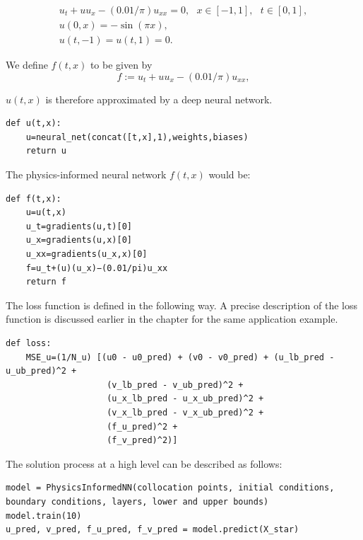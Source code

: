 \documentclass[book.tex]{subfiles}
\begin{document}
\[
\begin{array}{l}
u_t + u u_x - (0.01/\pi) u_{xx} = 0,\ \ \ x \in [-1,1],\ \ \ t \in [0,1],\\
u(0,x) = -\sin(\pi x),\\
u(t,-1) = u(t,1) = 0.
\end{array}
\]

We define $f(t,x)$ to be given by
\[
f := u_t + u u_x - (0.01/\pi) u_{xx},
\]

$u(t,x)$ is therefore approximated by a deep neural network. 
\begin{lstlisting}
def u(t,x):
    u=neural_net(concat([t,x],1),weights,biases)
    return u
\end{lstlisting}

The physics-informed neural network $f(t, x)$ would be:
\begin{lstlisting}
def f(t,x):
    u=u(t,x)
    u_t=gradients(u,t)[0]
    u_x=gradients(u,x)[0]
    u_xx=gradients(u_x,x)[0]
    f=u_t+(u)(u_x)−(0.01/pi)u_xx
    return f
\end{lstlisting}
The loss function is defined in the following way. A precise description of the loss function is discussed earlier in the chapter for the same application example.
\begin{lstlisting}
def loss:
    MSE_u=(1/N_u) [(u0 - u0_pred) + (v0 - v0_pred) + (u_lb_pred - u_ub_pred)^2 +
                    (v_lb_pred - v_ub_pred)^2 + 
                    (u_x_lb_pred - u_x_ub_pred)^2 + 
                    (v_x_lb_pred - v_x_ub_pred)^2 + 
                    (f_u_pred)^2 + 
                    (f_v_pred)^2)]
\end{lstlisting}
The solution process at a high level can be described as follows:

\begin{lstlisting}
model = PhysicsInformedNN(collocation points, initial conditions, boundary conditions, layers, lower and upper bounds)
model.train(10)
u_pred, v_pred, f_u_pred, f_v_pred = model.predict(X_star)
\end{lstlisting}
\end{document}
